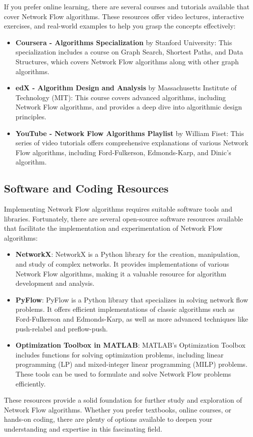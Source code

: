 \documentclass[12pt]{book} %
\begin{document}
If you prefer online learning, there are several courses and tutorials available that cover Network Flow algorithms. These resources offer video lectures, interactive exercises, and real-world examples to help you grasp the concepts effectively:

\begin{itemize}
    \item \textbf{Coursera - Algorithms Specialization} by Stanford University: This specialization includes a course on Graph Search, Shortest Paths, and Data Structures, which covers Network Flow algorithms along with other graph algorithms.
    \item \textbf{edX - Algorithm Design and Analysis} by Massachusetts Institute of Technology (MIT): This course covers advanced algorithms, including Network Flow algorithms, and provides a deep dive into algorithmic design principles.
    \item \textbf{YouTube - Network Flow Algorithms Playlist} by William Fiset: This series of video tutorials offers comprehensive explanations of various Network Flow algorithms, including Ford-Fulkerson, Edmonds-Karp, and Dinic's algorithm.
\end{itemize}

\subsection{Software and Coding Resources}

Implementing Network Flow algorithms requires suitable software tools and libraries. Fortunately, there are several open-source software resources available that facilitate the implementation and experimentation of Network Flow algorithms:

\begin{itemize}
    \item \textbf{NetworkX}: NetworkX is a Python library for the creation, manipulation, and study of complex networks. It provides implementations of various Network Flow algorithms, making it a valuable resource for algorithm development and analysis.
    
    \item \textbf{PyFlow}: PyFlow is a Python library that specializes in solving network flow problems. It offers efficient implementations of classic algorithms such as Ford-Fulkerson and Edmonds-Karp, as well as more advanced techniques like push-relabel and preflow-push.
    
    \item \textbf{Optimization Toolbox in MATLAB}: MATLAB's Optimization Toolbox includes functions for solving optimization problems, including linear programming (LP) and mixed-integer linear programming (MILP) problems. These tools can be used to formulate and solve Network Flow problems efficiently.
\end{itemize}

These resources provide a solid foundation for further study and exploration of Network Flow algorithms. Whether you prefer textbooks, online courses, or hands-on coding, there are plenty of options available to deepen your understanding and expertise in this fascinating field.
\end{document}
